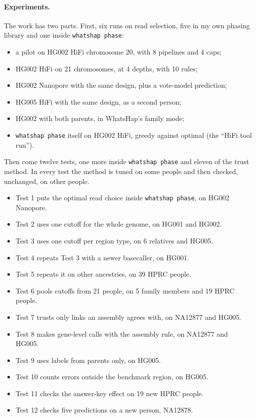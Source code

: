 \documentclass[11pt]{article}
\newcommand{\code}[1]{\texttt{#1}}
\begin{document}
\paragraph{Experiments.} The work has two parts. First, six runs on read
selection, five in my own phasing library and one inside
\code{whatshap phase}:

\begin{itemize}
\item a pilot on HG002 HiFi chromosome 20, with 8 pipelines and 4 caps;
\item HG002 HiFi on 21 chromosomes, at 4 depths, with 10 rules;
\item HG002 Nanopore with the same design, plus a vote-model prediction;
\item HG005 HiFi with the same design, as a second person;
\item HG002 with both parents, in WhatsHap's family mode;
\item \code{whatshap phase} itself on HG002 HiFi, greedy against optimal
  (the \enquote{HiFi tool run}).
\end{itemize}

Then come twelve tests, one more inside \code{whatshap phase} and eleven of
the trust method. In every test the method is tuned on some people and then
checked, unchanged, on other people.

\begin{itemize}
\item Test 1 puts the optimal read choice inside \code{whatshap phase}, on HG002 Nanopore.
\item Test 2 uses one cutoff for the whole genome, on HG001 and HG002.
\item Test 3 uses one cutoff per region type, on 6 relatives and HG005.
\item Test 4 repeats Test 3 with a newer basecaller, on HG001.
\item Test 5 repeats it on other ancestries, on 39 HPRC people.
\item Test 6 pools cutoffs from 21 people, on 5 family members and 19 HPRC people.
\item Test 7 trusts only links an assembly agrees with, on NA12877 and HG005.
\item Test 8 makes gene-level calls with the assembly rule, on NA12877 and HG005.
\item Test 9 uses labels from parents only, on HG005.
\item Test 10 counts errors outside the benchmark region, on HG005.
\item Test 11 checks the answer-key effect on 19 new HPRC people.
\item Test 12 checks five predictions on a new person, NA12878.
\end{itemize}
\end{document}
